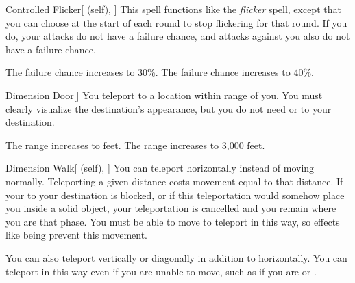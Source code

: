 \lowercase{\hypertarget{spell:Controlled Flicker}{}}\label{spell:Controlled Flicker}
\begin{attuneability}[Rank 4]{\hypertarget{spell:Controlled Flicker}{Controlled Flicker}}[ (self), ]
This spell functions like the \textit{flicker} spell, except that you can choose at the start of each round to stop flickering for that round.
If you do, your attacks do not have a failure chance, and attacks against you also do not have a failure chance.

 The failure chance increases to 30\%.
 The failure chance increases to 40\%.
\end{attuneability}
\vspace{0.25em}



\lowercase{\hypertarget{spell:Dimension Door}{}}\label{spell:Dimension Door}
\begin{freeability}[Rank 4]{\hypertarget{spell:Dimension Door}{Dimension Door}}[]
You teleport to a location within \rnglong range of you.
You must clearly visualize the destination's appearance, but you do not need  or  to your destination.

\rankline
{} The range increases to \rngext feet.
 The range increases to 3,000 feet.
\end{freeability}
\vspace{0.25em}



\lowercase{\hypertarget{spell:Dimension Walk}{}}\label{spell:Dimension Walk}
\begin{attuneability}[Rank 4]{\hypertarget{spell:Dimension Walk}{Dimension Walk}}[ (self), ]
You can teleport horizontally instead of moving normally.
Teleporting a given distance costs movement equal to that distance.
If your  to your destination is blocked, or if this teleportation would somehow place you inside a solid object, your teleportation is cancelled and you remain where you are that phase.
You must be able to move to teleport in this way, so effects like being  prevent this movement.

\rankline
{} You can also teleport vertically or diagonally in addition to horizontally.
 You can teleport in this way even if you are unable to move, such as if you are  or .
\end{attuneability}
\vspace{0.25em}



